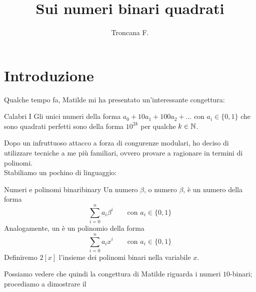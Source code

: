 \documentclass{article}
\title{Sui numeri binari quadrati}
\author{Troncana F.}
\date{}
\begin{document}
\maketitle

\section*{Introduzione}

Qualche tempo fa, Matilde mi ha presentato un'interessante congettura:

\begin{proposition}{Calabri I}{}
    Gli unici numeri della forma $a_0+10a_1+100a_2+...$ con $a_i \in \{0,1\}$ che sono quadrati perfetti sono della forma $10^{2k}$ per qualche $k \in \mathbb{N}$.
\end{proposition}

Dopo un infruttuoso attacco a forza di congurenze modulari, ho deciso di utilizzare tecniche a me più familiari, ovvero provare a ragionare in termini di polinomi.\\
Stabiliamo un pochino di linguaggio:

\begin{definition}{Numeri e polinomi binari}{binary}
    Un numero  $\beta$, o numero $\beta$, è un numero della forma
    \[\sum_{i=0}^n a_i \beta^i \qquad \text{con } a_i \in\{0,1\}\]
    Analogamente, un  è un polinomio della forma
    \[\sum_{i=0}^n a_i x^i \qquad \text{con } a_i \in\{0,1\}\]
    Definiremo $2[x]$ l'insieme dei polinomi binari nella variabile $x$.
\end{definition}

Possiamo vedere che quindi la congettura di Matilde riguarda i numeri $10$-binari; procediamo a dimostrare il
\end{document}
